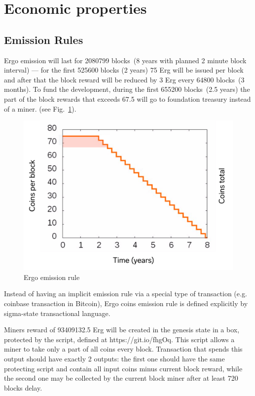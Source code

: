 \section{Economic properties}

\subsection{Emission Rules}

Ergo emission will last for 2080799 blocks~(8 years with planned 2 minute block interval) --- for the
first 525600 blocks (2 years) 75 Erg will be issued per block and after that the block reward will be
reduced by 3 Erg every 64800 blocks~(3 months).
To fund the development, during the first 655200 blocks~(2.5 years) the part of the block rewards that
exceeds 67.5 will go to foundation treasury instead of a miner.  (see Fig.~\ref{fig:emission}).

\begin{figure}[H]
    \centering
    \includegraphics[width=\textwidth]{img/emission.jpg}
    \caption{Ergo emission rule
    \label{fig:emission}}
\end{figure}


Instead of having an implicit emission rule via a special type of transaction (e.g. coinbase transaction in Bitcoin),
Ergo coins emission rule is defined explicitly by sigma-state transactional language.

Miners reward of 93409132.5 Erg will be created in the genesis state in a box,
protected by the script, defined at https://git.io/fhgOq.
This script allows a miner to take only a part of all coins every block.
Transaction that spends this output should have exactly 2 outputs: the first one should
have the same protecting script and contain all input coins minus current block reward,
while the second one may be collected by the current block miner after at least
720 blocks delay.

